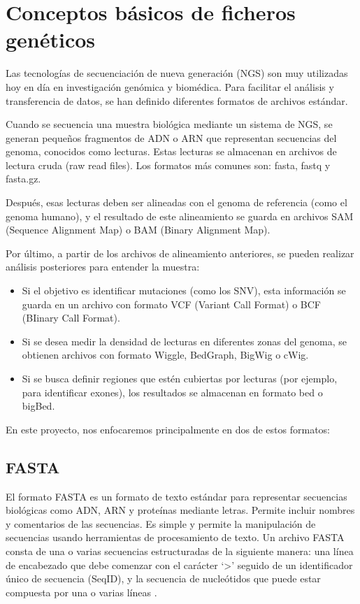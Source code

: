 \documentclass[11pt,spanish,listoffigures,listoftables]{tfgetsinf}
\begin{document}
\section{Conceptos básicos de ficheros genéticos}

Las tecnologías de secuenciación de nueva generación (NGS) son muy utilizadas hoy en día en investigación genómica y biomédica. Para facilitar el análisis y transferencia de datos, se han definido diferentes formatos de archivos estándar. 

Cuando se secuencia una muestra biológica mediante un sistema de NGS, se generan pequeños fragmentos de ADN o ARN que representan secuencias del genoma, conocidos como lecturas. Estas lecturas se almacenan en archivos de lectura cruda (raw read files). Los formatos más comunes son: fasta, fastq y fasta.gz. 

Después, esas lecturas deben ser alineadas con el genoma de referencia (como el genoma humano), y el resultado de este alineamiento se guarda en archivos SAM (Sequence Alignment Map) o BAM (Binary Alignment Map). 

Por último, a partir de los archivos de alineamiento anteriores, se pueden realizar análisis posteriores para entender la muestra:  

\begin{itemize}
   \item Si el objetivo es identificar mutaciones (como los SNV), esta información se guarda en un archivo con formato VCF (Variant Call Format) o BCF (BIinary Call Format). 
   \item Si se desea medir la densidad de lecturas en diferentes zonas del genoma, se obtienen archivos con formato Wiggle, BedGraph, BigWig o cWig.
   \item Si se busca definir regiones que estén cubiertas por lecturas (por ejemplo, para identificar exones), los resultados se almacenan en formato bed o bigBed.
\end{itemize}

En este proyecto, nos enfocaremos principalmente en dos de estos formatos: 

\subsection{FASTA}

El formato FASTA es un formato de texto estándar para representar secuencias biológicas como ADN, ARN y proteínas mediante letras. Permite incluir nombres y comentarios de las secuencias. Es simple y permite la manipulación de secuencias usando herramientas de procesamiento de texto\cite{JAV}. Un archivo FASTA consta de una o varias secuencias estructuradas de la siguiente manera: una línea de encabezado que debe comenzar con el carácter ‘>’ seguido de un identificador único de secuencia (SeqID), y la secuencia de nucleótidos que puede estar compuesta por una o varias líneas \cite{FAS}.
\end{document}

